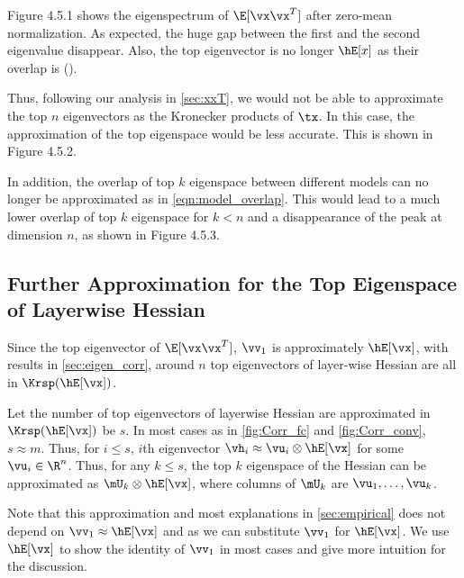 Figure 4.5.1 shows the eigenspectrum of $\E[\vx\vx^T]$ after zero-mean normalization. As expected, the huge gap between the first and the second eigenvalue disappear. Also, the top eigenvector is no longer $\hE[x]$ as their overlap is ().

Thus, following our analysis in \cref{sec:xxT}, we would not be able to approximate the top $n$ eigenvectors as the Kronecker products of $\tx$. In this case, the approximation of the top eigenspace would be less accurate. This is shown in Figure 4.5.2.

In addition, the overlap of top $k$ eigenspace between different models can no longer be approximated as in \cref{eqn:model_overlap}. This would lead to a much lower overlap of top $k$ eigenspace for $k < n$ and a disappearance of the peak at dimension $n$, as shown in Figure 4.5.3.

\subsection{Further Approximation for the Top Eigenspace of Layerwise Hessian}
\label{sec:approx_top_eig}
Since the top eigenvector of $\E[\vx\vx^T]$, $\vv_1$ is approximately $\hE[\vx]$, with results in \cref{sec:eigen_corr}, around $n$ top eigenvectors of layer-wise Hessian are all in $\Krsp(\hE[\vx])$. 

Let the number of top eigenvectors of layerwise Hessian are approximated in $\Krsp(\hE[\vx])$ be $s$. In most cases as in \cref{fig:Corr_fc} and \cref{fig:Corr_conv}, $s \approx m$. Thus, for $i \leq s$, $i$th eigenvector $\vh_i \approx \vu_i \otimes \hE[\vx]$ for some $\vu_i \in \R^n$. Thus, for any $k \leq s$, the top $k$ eigenspace of the Hessian can be approximated as $\mU_k \otimes \hE[\vx]$, where columns of $\mU_k$ are $\vu_1, \ldots, \vu_k$.

Note that this approximation and most explanations in \cref{sec:empirical} does not depend on $\vv_1 \approx \hE[\vx]$ and as we can substitute $\vv_1$ for $\hE[\vx]$. We use $\hE[\vx]$ to show the identity of $\vv_1$ in most cases and give more intuition for the discussion.



